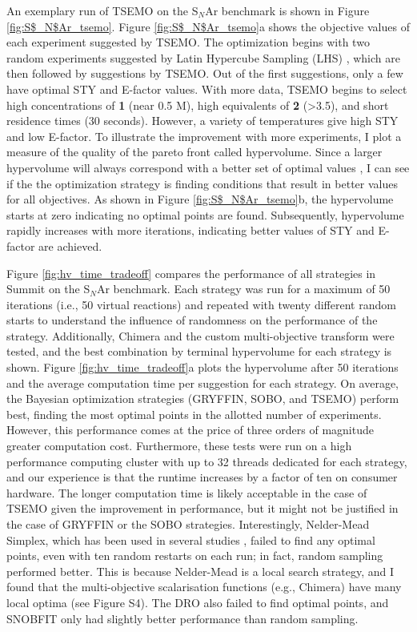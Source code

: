 An exemplary run of TSEMO on the S$_N$Ar benchmark is shown in Figure \ref{fig:S$_N$Ar_tsemo}. Figure \ref{fig:S$_N$Ar_tsemo}a shows the objective values of each experiment suggested by TSEMO. The optimization begins with two random experiments suggested by Latin Hypercube Sampling (LHS) \cite{McKay1979}, which are then followed by suggestions by TSEMO. Out of the first suggestions, only a few have optimal STY and E-factor values. With more data, TSEMO begins to select high concentrations of \textbf{1} (near 0.5 M), high equivalents of \textbf{2} (>3.5), and short residence times (30 seconds). However, a variety of temperatures give high STY and low E-factor. To illustrate the improvement with more experiments, I plot a measure of the quality of the pareto front called hypervolume. Since a larger hypervolume will always correspond with a better set of optimal values \cite{Zitzler2003}, I can see if the the optimization strategy is finding conditions that result in better values for all objectives. As shown in Figure \ref{fig:S$_N$Ar_tsemo}b, the hypervolume starts at zero indicating no optimal points are found. Subsequently, hypervolume rapidly increases with more iterations, indicating better values of STY and E-factor are achieved.

Figure \ref{fig:hv_time_tradeoff} compares the performance of all strategies in Summit on the S$_N$Ar benchmark. Each strategy was run for a maximum of 50 iterations (i.e., 50 virtual reactions) and repeated with twenty different random starts to understand the influence of randomness on the performance of the strategy. Additionally, Chimera and the custom multi-objective transform were tested, and the best combination by terminal hypervolume for each strategy is shown. Figure \ref{fig:hv_time_tradeoff}a plots the hypervolume after 50 iterations and the average computation time per suggestion for each strategy. On average, the Bayesian optimization strategies (GRYFFIN, SOBO, and TSEMO) perform best, finding the most optimal points in the allotted number of experiments. However, this performance comes at the price of three orders of magnitude greater computation cost. Furthermore, these tests were run on a high performance computing cluster with up to 32 threads dedicated for each strategy, and our experience is that the runtime increases by a factor of ten on consumer hardware.  The longer computation time is likely acceptable in the case of TSEMO given the improvement in performance, but it might not be justified in the case of GRYFFIN or the SOBO strategies.  Interestingly, Nelder-Mead Simplex, which has been used in several studies \cite{McMullen2010b, Parrott2011, Sans2015, CortesBorda2016, Fitzpatrick2016, McMullen2010a, Poscharny2018}, failed to find any optimal points, even with ten random restarts on each run; in fact, random sampling performed better. This is because Nelder-Mead is a local search strategy, and I found that the multi-objective scalarisation functions (e.g., Chimera) have many local optima (see Figure S4). The DRO also failed to find optimal points, and SNOBFIT only had slightly better performance than random sampling.

